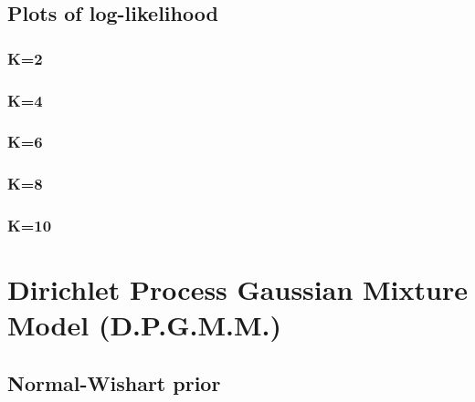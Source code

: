 \documentclass{article}
\begin{document}
\subsection{Plots of log-likelihood}
\subsubsection{K=2}
\subsubsection{K=4}
\subsubsection{K=6}
\subsubsection{K=8}
\subsubsection{K=10}

\newpage
\section{Dirichlet Process Gaussian Mixture Model (D.P.G.M.M.)}
\subsection{Normal-Wishart prior}
\end{document}
